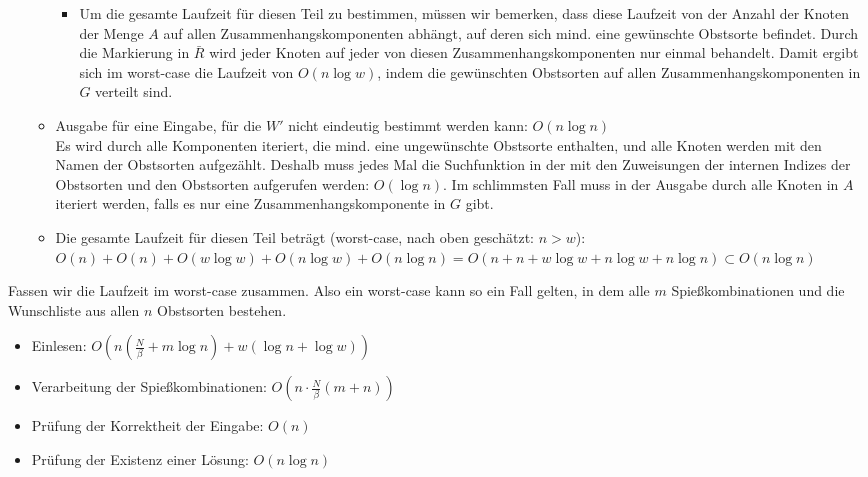\begin{itemize}
\begin{itemize}
\begin{itemize}
    \item Um die gesamte Laufzeit für diesen Teil zu bestimmen, müssen wir bemerken, dass 
    diese Laufzeit von der Anzahl der Knoten der Menge $A$ auf allen Zusammenhangskomponenten 
    abhängt, auf deren sich mind. eine gewünschte Obstsorte befindet. Durch die Markierung
    in $\bar{R}$ wird jeder Knoten auf jeder von diesen Zusammenhangskomponenten nur einmal behandelt. 
    Damit ergibt sich im worst-case die Laufzeit von $O(n \log w)$, indem die gewünschten Obstsorten auf 
    allen Zusammenhangskomponenten in $G$ verteilt sind.
    \end{itemize}

    \item Ausgabe für eine Eingabe, für die $W'$ nicht eindeutig bestimmt werden kann: $O(n \log n)$\\
    Es wird durch alle Komponenten iteriert, die mind. eine ungewünschte Obstsorte enthalten,
    und alle Knoten werden mit den Namen der Obstsorten aufgezählt.
    Deshalb muss jedes Mal die Suchfunktion in der  mit den Zuweisungen 
    der internen Indizes der Obstsorten und den Obstsorten aufgerufen werden: $O(\log n)$.
    Im schlimmsten Fall muss in der Ausgabe durch alle Knoten in $A$ iteriert werden, falls
    es nur eine Zusammenhangskomponente in $G$ gibt.

    \item Die gesamte Laufzeit für diesen Teil beträgt (worst-case, nach oben geschätzt: $n > w$):
    $O(n) + O(n) + O(w \log w) + O(n \log w) + O(n \log n) = O(n + n + w \log w + n \log w + n \log n)
    \subset O(n \log n)$
  \end{itemize}

\end{itemize}

Fassen wir die Laufzeit im worst-case zusammen. Also ein worst-case kann so ein Fall gelten,
in dem alle $m$ Spießkombinationen und die Wunschliste aus allen $n$ Obstsorten bestehen. 
\begin{itemize}
  \item Einlesen: $O(n (\frac{N}{\beta} + m \log n) + w (\log n + \log w))$
  \item Verarbeitung der Spießkombinationen: $O(n\cdot \frac{N}{\beta}(m + n))$
  \item Prüfung der Korrektheit der Eingabe: $O(n)$
  \item Prüfung der Existenz einer Lösung: $O(n \log n)$
\end{itemize}


